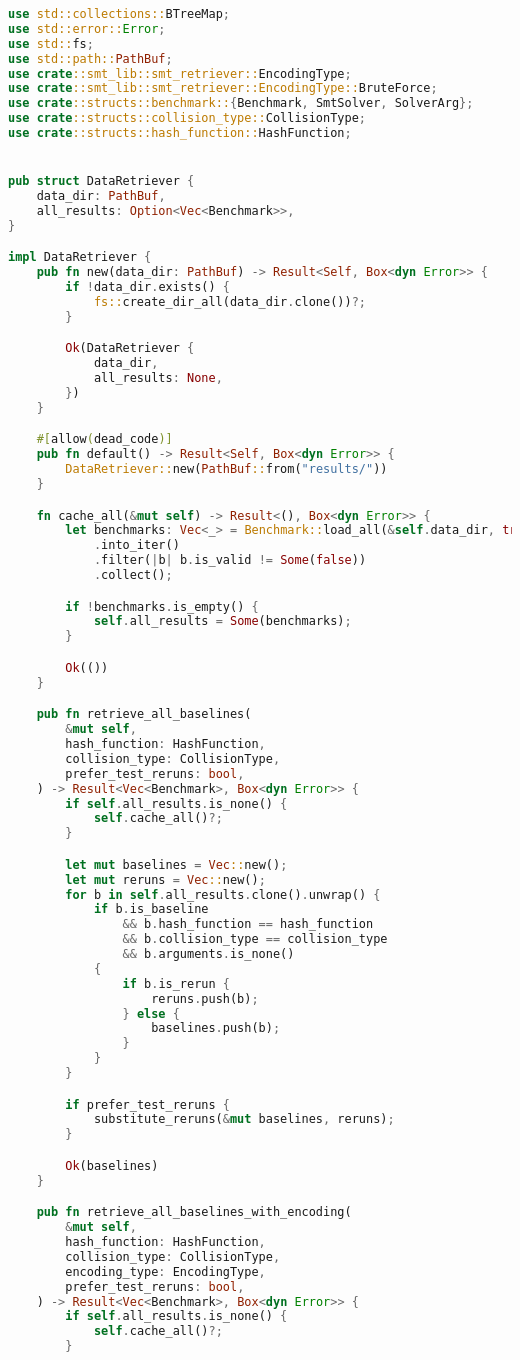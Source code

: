 \begin{lstlisting}[language=rust, caption={data/data\_retriever.rs}]
use std::collections::BTreeMap;
use std::error::Error;
use std::fs;
use std::path::PathBuf;
use crate::smt_lib::smt_retriever::EncodingType;
use crate::smt_lib::smt_retriever::EncodingType::BruteForce;
use crate::structs::benchmark::{Benchmark, SmtSolver, SolverArg};
use crate::structs::collision_type::CollisionType;
use crate::structs::hash_function::HashFunction;


pub struct DataRetriever {
	data_dir: PathBuf,
	all_results: Option<Vec<Benchmark>>,
}

impl DataRetriever {
	pub fn new(data_dir: PathBuf) -> Result<Self, Box<dyn Error>> {
		if !data_dir.exists() {
			fs::create_dir_all(data_dir.clone())?;
		}

		Ok(DataRetriever {
			data_dir,
			all_results: None,
		})
	}

	#[allow(dead_code)]
	pub fn default() -> Result<Self, Box<dyn Error>> {
		DataRetriever::new(PathBuf::from("results/"))
	}

	fn cache_all(&mut self) -> Result<(), Box<dyn Error>> {
		let benchmarks: Vec<_> = Benchmark::load_all(&self.data_dir, true)?
			.into_iter()
			.filter(|b| b.is_valid != Some(false))
			.collect();

		if !benchmarks.is_empty() {
			self.all_results = Some(benchmarks);
		}

		Ok(())
	}

	pub fn retrieve_all_baselines(
		&mut self,
		hash_function: HashFunction,
		collision_type: CollisionType,
		prefer_test_reruns: bool,
	) -> Result<Vec<Benchmark>, Box<dyn Error>> {
		if self.all_results.is_none() {
			self.cache_all()?;
		}

		let mut baselines = Vec::new();
		let mut reruns = Vec::new();
		for b in self.all_results.clone().unwrap() {
			if b.is_baseline
				&& b.hash_function == hash_function
				&& b.collision_type == collision_type
				&& b.arguments.is_none()
			{
				if b.is_rerun {
					reruns.push(b);
				} else {
					baselines.push(b);
				}
			}
		}

		if prefer_test_reruns {
			substitute_reruns(&mut baselines, reruns);
		}

		Ok(baselines)
	}

	pub fn retrieve_all_baselines_with_encoding(
		&mut self,
		hash_function: HashFunction,
		collision_type: CollisionType,
		encoding_type: EncodingType,
		prefer_test_reruns: bool,
	) -> Result<Vec<Benchmark>, Box<dyn Error>> {
		if self.all_results.is_none() {
			self.cache_all()?;
		}


\end{lstlisting}
